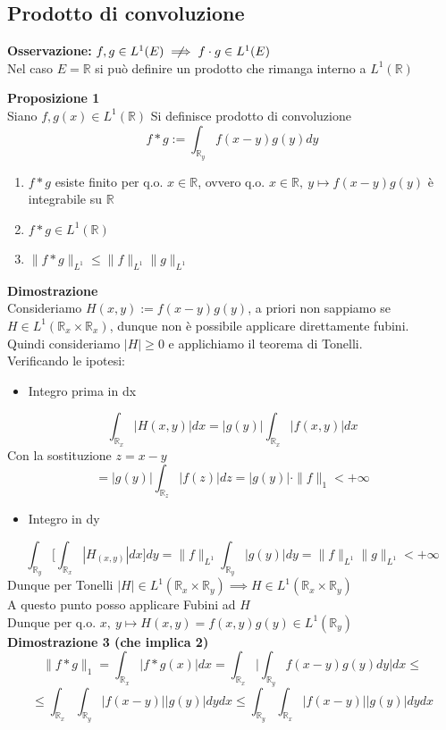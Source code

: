 \documentclass[a4paper]{article}
\newcommand{\R}{\mathbb{R}}
\begin{document}
\subsection{Prodotto di convoluzione}
\textbf{Osservazione: }$f,g\in L^{1}(E)\centernot\implies f\cdot g\in L^{1}(E)$
\\Nel caso $E=\R$ si può definire un prodotto che rimanga interno a $L^{1}(\R)$ 
\begin{tcolorbox}
	\textbf{Proposizione 1} 
	\\Siano $f,g(x)\in L^{1}(\R)$ Si definisce prodotto di convoluzione
	\[ f*g:=\int_{\R_y}^{} f(x-y)g(y)dy\] 
\end{tcolorbox}
\begin{enumerate}
	\item $f*g$ esiste finito per q.o. $x\in \R$, ovvero q.o. $x\in \R,\ y\mapsto f(x-y)g(y)$ è integrabile su $\R$
	\item$f*g \in L^{1}(\R)$
	\item$\|f*g\|_{L^1}\le \|f\|_{L^1}\|g\|_{L^1}$ 
\end{enumerate}
\textbf{Dimostrazione} 
\\Consideriamo $H(x,y):=f(x-y)g(y)$, a priori non sappiamo se $H\in L^{1}(\R_x \times \R_x)$, dunque non è possibile applicare direttamente fubini.
\\Quindi consideriamo $|H|\ge 0$ e applichiamo il teorema di Tonelli.
\\Verificando le ipotesi:
\begin{itemize}
	\item Integro prima in dx
\end{itemize}
\[\int_{\R_x}^{} |H(x,y)|dx=|g(y)|\int_{\R_x}^{}|f(x,y)|dx\]   
Con la sostituzione $z=x-y$ 
\[=|g(y)|\int_{\R_z}^{} |f(z)|dz=|g(y)|\cdot \|f\|_1<+\infty\] 
\begin{itemize}
	\item Integro in dy
\end{itemize}
\[\int_{\R_y}^{} \bigg[\int_{\R_x}^{} |H_(x,y)|dx\bigg]dy=\|f\|_{L^1}\int_{\R_y}^{} |g(y)|dy=\|f\|_{L^1}\|g\|_{L^1}<+\infty\]
Dunque per Tonelli $|H|\in L^{1}(\R_x \times \R_y)\implies H\in L^1(\R_x \times \R_y)$
\\A questo punto posso applicare Fubini ad $H$ 
\\Dunque per q.o. $x,\ y\mapsto H(x,y)=f(x,y)g(y)\in L^{1}(\R_y)$
\\\textbf{Dimostrazione 3 (che implica 2)}
\[\|f*g\|_{1}=\int_{\R_x}^{} |f*g(x)|dx=\int_{\R_x}^{} \bigg|\int_{\R_y}^{} f(x-y)g(y)dy\bigg|dx\le \]
\[\le \int_{\R_x}^{} \int_{\R_y}{|f(x-y)| |g(y)|dydx}\le \int_{\R_y}^{} \int_{\R_x}{|f(x-y)| |g(y)|dydx}\]
\end{document}
